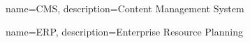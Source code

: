 {
  name=CMS,
  description={Content Management System}
}

{
  name=ERP,
  description={Enterprise Resource Planning}
}